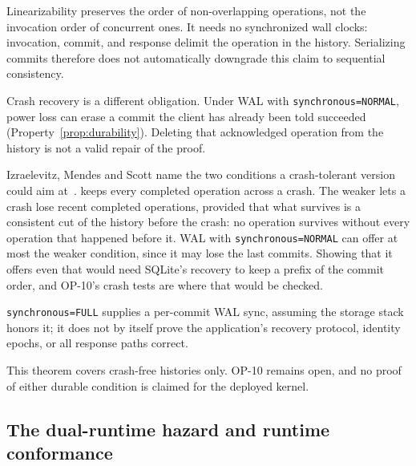 \documentclass[11pt,a4paper]{article}
\theoremstyle{definition}
\theoremstyle{remark}
\begin{document}
\begin{pdboundary}
\setlength{\parskip}{4pt plus 1pt}
Linearizability preserves the order of non-overlapping operations, not the
invocation order of concurrent ones. It needs no synchronized wall clocks:
invocation, commit, and response delimit the operation in the history.
Serializing commits therefore does not automatically downgrade this claim to
sequential consistency.

Crash recovery is a different obligation. Under WAL with
\texttt{synchronous=NORMAL}, power loss can erase a commit the client has
\mbox{already} been told succeeded (Property~\ref{prop:durability}). Deleting that
\mbox{acknowledged} operation from the history is not a valid repair of the proof.

Izraelevitz, Mendes and Scott name the two conditions a crash-tolerant version
could aim at~.  keeps
every completed operation across a crash. The weaker
 lets a crash lose recent completed operations, provided that
what survives is a consistent cut of the history before the crash: no
operation survives without every operation that happened before it. WAL with
\texttt{synchronous=NORMAL} can offer at most the weaker condition, since it may
lose the last commits. Showing that it offers even that would need SQLite's
recovery to keep a prefix of the commit order, and OP-10's crash tests are where
that would be checked.

\texttt{synchronous=FULL} supplies a per-commit WAL sync, assuming the storage
stack honors it; it does not by itself prove the application's recovery protocol,
identity epochs, or all response paths correct.

This theorem covers crash-free
histories only. OP-10 remains open, and no proof of either durable condition is
claimed for the deployed kernel.
\end{pdboundary}


\subsection{The dual-runtime hazard and runtime conformance}
\end{document}
